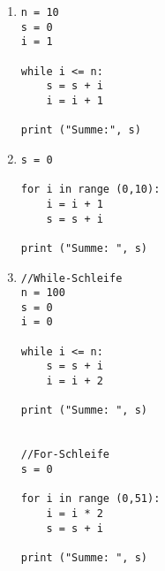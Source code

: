 \begin{enumerate}
  
\item \begin{lstlisting}[label=KontrollstrukturenSolutionA]
n = 10
s = 0
i = 1

while i <= n:
   	s = s + i
	i = i + 1

print ("Summe:", s)

\end{lstlisting} 

\item \begin{lstlisting}[label=KontrollstrukturenSolutionb]
s = 0

for i in range (0,10):
    i = i + 1
    s = s + i
    
print ("Summe: ", s)
\end{lstlisting} 

\item \begin{lstlisting}[label=KontrollstrukturenSolutionb]
//While-Schleife
n = 100
s = 0
i = 0

while i <= n:
    s = s + i
    i = i + 2
	
print ("Summe: ", s)

	
//For-Schleife
s = 0

for i in range (0,51):
    i = i * 2
    s = s + i
    
print ("Summe: ", s)
\end{lstlisting} 

\end{enumerate}